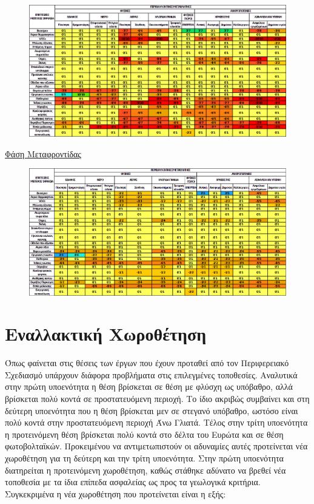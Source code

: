 \documentclass[12pt]{article}
\begin{document}
	\begin{figure} [H]
		\begin{center}
			\includegraphics [scale = 0.60] {table31.png}
		\end{center}
	\end{figure}

	\underline{Φάση Μεταφροντίδας}
	
	\begin{figure} [H]
		\begin{center}
			\includegraphics [scale = 0.60] {table32.png}
		\end{center}
	\end{figure}

	\section{Εναλλακτική Χωροθέτηση}
	
	Όπως φαίνεται στις θέσεις των έργων που έχουν προταθεί από τον Περιφερειακό Σχεδιασμό υπάρχουν διάφορα προβλήματα στις επιλεγμένες τοποθεσίες. Αναλυτικά στην πρώτη υποενότητα η θέση βρίσκεται σε θέση με φλύσχη ως υπόβαθρο, αλλά βρίσκεται πολύ κοντά σε προστατευόμενη περιοχή. Το ίδιο ακριβώς συμβαίνει και στη δεύτερη υποενότητα που η θέση βρίσκεται  μεν σε στεγανό υπόβαθρο, ωστόσο είναι πολύ κοντά στην προστατευόμενη περιοχή Άνω Γλιατά. Τέλος στην τρίτη   υποενότητα η προτεινόμενη θέση βρίσκεται πολύ κοντά στο δέλτα του Ευρώτα και σε θέση φωτοβολταϊκών. Προκειμένου να αντιμετωπιστούν οι αδυναμίες αυτές προτείνεται νέα χωροθέτηση για τη δεύτερη και την τρίτη υποενότητα. Στην πρώτη υποενότητα διατηρείται η προτεινόμενη χωροθέτηση, καθώς στάθηκε αδύνατο να βρεθεί νέα τοποθεσία με τα ίδια επίπεδα ασφαλείας ως προς τα γεωλογικά κριτήρια. Συγκεκριμένα η νέα χωροθέτηση που προτείνεται είναι η εξής: 
	
\end{document}
